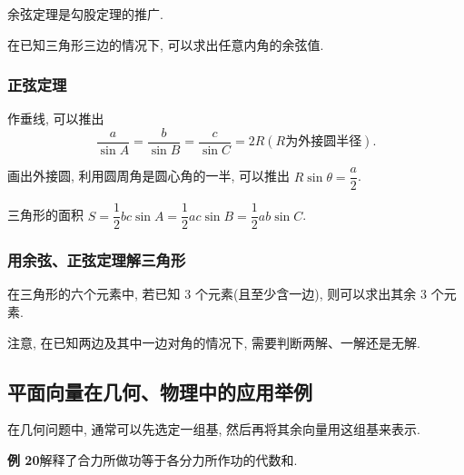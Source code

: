 \documentclass[titlepage]{ctexart}
\begin{document}
余弦定理是勾股定理的推广.

在已知三角形三边的情况下, 可以求出任意内角的余弦值.

\subsubsection{正弦定理}

作垂线, 可以推出
\[
\frac{a}{\sin A} = \frac{b}{\sin B} = \frac{c}{\sin C} = 2R(R\text{为外接圆半径}).
\]

画出外接圆, 利用圆周角是圆心角的一半, 可以推出 $R\sin \theta = \dfrac{a}{2}$.

三角形的面积 $S = \dfrac{1}{2}bc\sin A = \dfrac{1}{2}ac\sin B = \dfrac{1}{2}ab\sin C$.

\subsubsection{用余弦、正弦定理解三角形}

在三角形的六个元素中, 若已知 3 个元素(且至少含一边), 则可以求出其余 3 个元素.

注意, 在已知两边及其中一边对角的情况下, 需要判断两解、一解还是无解.

\subsection{平面向量在几何、物理中的应用举例}

在几何问题中, 通常可以先选定一组基, 然后再将其余向量用这组基来表示.

\textbf{例 20}解释了合力所做功等于各分力所作功的代数和.
\end{document}
